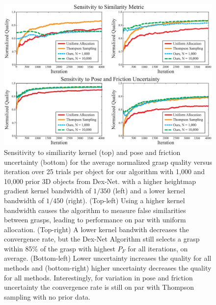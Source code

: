 \begin{figure}[t!]
\centering
\includegraphics[scale=0.23]{figures/illustrations/combined_weight_and_u_sensitivity.eps}
\caption{Sensitivity to similiarity kernel (top) and pose and friction uncertainty (bottom) for the average normalized grasp quality versus iteration over 25 trials per object for our algorithm with 1,000 and 10,000 prior 3D objects from Dex-Net.
with a higher heightmap gradient kernel bandwidth of $1 / 350$ (left) and a lower kernel bandwidth of $1 / 450$ (right).
(Top-left) Using a higher kernel bandwidth causes the algorithm to measure false similarities between grasps, leading to performance on par with uniform allocation.
(Top-right) A lower kernel bandwith decreases the convergence rate, but the Dex-Net Algorithm still selects a grasp within 85\% of the grasp with highest $P_F$ for all iterations, on average.
(Bottom-left) Lower uncertainty increases the quality for all methods and (bottom-right) higher uncertainty decreases the quality for all methods.
Interestingly, for variation in pose and friction uncertainty the convergence rate is still on par with Thompson sampling with no prior data.
}
\vspace*{-15pt}
\end{figure}


